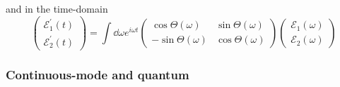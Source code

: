 and in the time-domain
\begin{equation}
    \begin{pmatrix}
        \mathcal{E}_1^\prime(t)
        \\
        \mathcal{E}_2^\prime(t)
    \end{pmatrix}
    =
    \int\dd{\omega}e^{i\omega t}
    \begin{pmatrix}
        \cos\Theta(\omega) & \sin\Theta(\omega)
        \\
        -\sin\Theta(\omega) & \cos\Theta(\omega)
    \end{pmatrix}
    \begin{pmatrix}
        \mathcal{E}_1(\omega)
        \\
        \mathcal{E}_2(\omega)
    \end{pmatrix}
\end{equation}

\subsubsection{Continuous-mode and quantum}

